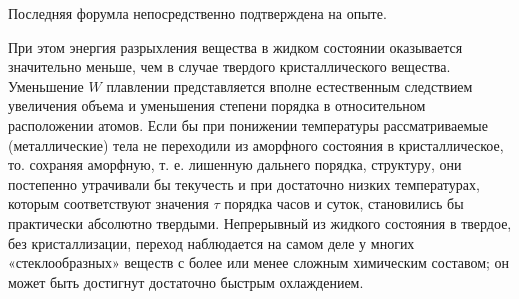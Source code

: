 \documentclass[a4paper, 12pt]{article}
\begin{document}
Последняя форумла непосредственно подтверждена на опыте.

При этом энергия разрыхления вещества в жидком состоянии оказывается значительно меньше, 
чем в случае твердого кристаллического вещества.
Уменьшение $W$ плавлении представляется вполне естественным следствием увеличения объема и уменьшения степени
 порядка в относительном расположении атомов.
 Если бы при понижении температуры рассматриваемые (металлические) тела не переходили из аморфного состояния в кристаллическое, то. сохраняя аморфную, 
 т. е. лишенную дальнего порядка, структуру, они постепенно утрачивали бы текучесть и при достаточно низких температурах, которым соответствуют значения 
 $\tau$ порядка часов и суток, становились
 бы практически абсолютно твердыми.
 Непрерывный
 из жидкого состояния в твердое, без кристаллизации,
 переход
 наблюдается на самом деле у многих «стеклообразных» веществ с более или менее сложным химическим составом;
 он может быть достигнут достаточно быстрым охлаждением.


\newpage
\end{document}
